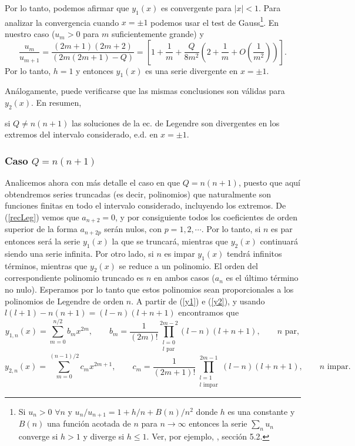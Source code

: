 Por lo tanto, podemos afirmar que $y_1(x)$ es convergente para $|x|<1$. Para analizar la convergencia cuando $x=\pm 1$ podemos usar el test de Gauss\footnote{Si $u_n>0$ $\forall n$ y $u_n/u_{n+1}=1+h/n+B(n)/n^2$ donde $h$ es una constante y $B(n)$ una función acotada de $n$ para $n\to\infty$ entonces la serie $\sum_n u_n$ converge si $h>1$ y diverge si $h\le 1$. Ver, por ejemplo, \cite{Arfken}, sección 5.2.}. En nuestro caso ($u_m>0$ para $m$ suficientemente grande) y 
\begin{equation}
\frac{u_m}{u_{m+1}}=\frac{(2m+1)(2m+2)}{(2m(2m+1)-Q)}=\left[1+\frac{1}{m}+\frac{Q}{8m^2}\left(2+\frac{1}{m}+O(\frac{1}{m^2})\right)\right].
\end{equation}
Por lo tanto, $h=1$ y entonces $y_1(x)$ es una serie divergente en $x=\pm 1$.

Análogamente, puede verificarse que las mismas conclusiones son válidas para $y_2(x)$. En resumen, 

\begin{tcolorbox}
si $Q\neq n(n+1)$ las soluciones de la ec. de Legendre son divergentes en los extremos del intervalo considerado, e.d. en $x=\pm 1$.
\end{tcolorbox}

\subsubsection{Caso $Q=n(n+1)$}
Analicemos ahora con más detalle el caso en que $Q=n(n+1)$, puesto que aquí obtendremos series truncadas (es decir, polinomios) que naturalmente son funciones finitas en todo el intervalo considerado, incluyendo los extremos. De (\ref{recLeg}) vemos que $a_{n+2}=0$, y por consiguiente todos los coeficientes de orden superior de la forma $a_{n+2p}$ serán nulos, con $p=1,2,\cdots$. Por lo tanto, si $n$ es par entonces será la serie $y_1(x)$ la que se truncará, mientras que $y_2(x)$ continuará siendo una serie infinita. Por otro lado, si $n$ es impar $y_1(x)$ tendrá infinitos términos, mientras que $y_2(x)$ se reduce a un polinomio. El orden del correspondiente polinomio truncado es $n$ en ambos casos ($a_n$ es el último término no nulo). Esperamos por lo tanto que estos polinomios sean proporcionales a los polinomios de Legendre de orden $n$. A partir de (\ref{y1}) e (\ref{y2}), y usando $l(l+1)-n(n+1)=(l-n)(l+n+1)$ encontramos que
\begin{equation}\label{y1n1}
y_{1,n}(x) = \sum_{m= 0}^{n/2}b_mx^{2m}, \qquad b_m=\frac{1}{(2m)!}
\prod_{\substack{l=0 \\ l \text{ par}}}^{2m-2}
(l-n)(l+n+1), \qquad n\text{ par},
\end{equation}
\begin{equation}\label{y2n1}
y_{2,n}(x)=\sum_{m= 0}^{(n-1)/2}c_mx^{2m+1}, \qquad c_m =\frac{1}{(2m+1)!}
\prod_{\substack{l=1 \\ l \text{ impar}}}^{2m-1}
 (l-n)(l+n+1), \qquad n\text{ impar}.
\end{equation}


